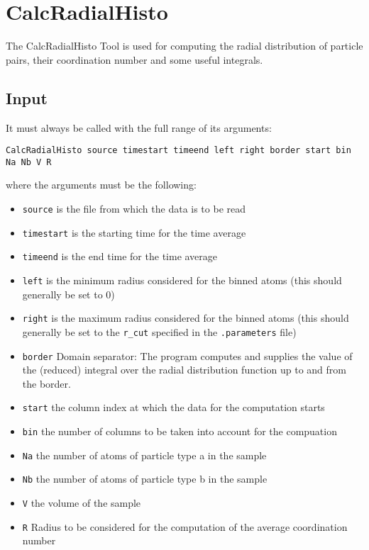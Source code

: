 \section{CalcRadialHisto}

The CalcRadialHisto Tool is used for computing the radial distribution of particle pairs, their coordination number and some useful integrals.

\subsection{Input}
It must always be called with the full range of its arguments:

\begin{lstlisting}
CalcRadialHisto source timestart timeend left right border start bin Na Nb V R
\end{lstlisting}

where the arguments must be the following:
\begin{itemize}
\item {\tt source} is the file from which the data is to be read
\item {\tt timestart} is the starting time for the time average
\item {\tt timeend} is the end time for the time average
\item {\tt left} is the minimum radius considered for the binned atoms (this should generally be set to 0)
\item {\tt right} is the maximum radius considered for the binned atoms (this should generally be set to the {\tt r\_cut} specified in the {\tt .parameters} file)
\item {\tt border} Domain separator: The program computes and supplies the value of the (reduced) integral over the radial distribution function up to and from the border.
\item {\tt start} the column index at which the data for the computation starts
\item {\tt bin} the number of columns to be taken into account for the compuation
\item {\tt Na} the number of atoms of particle type a in the sample
\item {\tt Nb} the number of atoms of particle type b in the sample
\item {\tt V} the volume of the sample
\item {\tt R} Radius to be considered for the computation of the average coordination number
\end{itemize}

